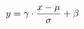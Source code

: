 \documentclass[preview]{standalone}
\begin{document}
\begin{align*}
\special{dvisvgm:raw <g id='unique000'>}y = \gamma \cdot \frac{x - \mu}{\sigma} + \beta\special{dvisvgm:raw </g>}
\end{align*}
\end{document}
